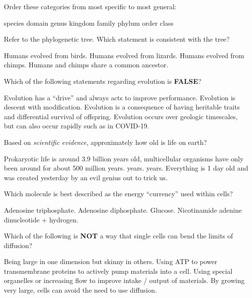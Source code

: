 \documentclass[exam,addpoints]{exam}
\begin{document}
\begin{questions}
\question[1] Order these categories from most specific to most general:
\begin{choices}
\choice species
\choice domain
\choice genus
\choice kingdom
\choice family
\choice phylum
\choice order
\choice class
\end{choices}

\question[1] Refer to the phylogenetic tree. Which statement is consistent with the tree?
\begin{choices}
\choice Humans evolved from birds.
\choice Humans evolved from lizards.
\choice Humans evolved from chimps.
\CorrectChoice Humans and chimps share a common ancestor. 
\end{choices}

\question[1] Which of the following statements regarding evolution is \textbf{FALSE}?
\begin{choices}
\CorrectChoice Evolution has a ``drive'' and always acts to improve performance.
\choice Evolution is descent with modification.
\choice Evolution is a consequence of having heritable traits and differential survival of offspring.
\choice Evolution occurs over geologic timescales, but can also occur rapidly such as in COVID-19.
\end{choices}

\question[1] Based on \emph{scientific evidence}, approximately how old is life on earth?
\begin{choices}
\CorrectChoice Prokaryotic life is around 3.9 billion years old, multicellular organisms have only been around for about 500 million years.
 years.
 years.
\choice Everything is 1 day old and was created yesterday by an evil genius out to trick us. 
\end{choices}

\question[1] Which molecule is best described as the energy ``currency'' used within cells?
\begin{choices}
\CorrectChoice Adenosine triphosphate.
\choice Adenosine diphosphate.
\choice Glucose.
\choice Nicotinamide adenine dinucleotide + hydrogen. 
\end{choices}

\clearpage
\question[1] Which of the following is \textbf{NOT} a way that single cells can bend the limits of diffusion?
\begin{choices}
\choice Being large in one dimension but skinny in others.
\choice Using ATP to power transmembrane proteins to actively pump materials into a cell.
\choice Using special organelles or increasing flow to improve intake / output of materials. 
\CorrectChoice By growing very large, cells can avoid the need to use diffusion. 
\end{choices}


\end{questions}
\end{document}
